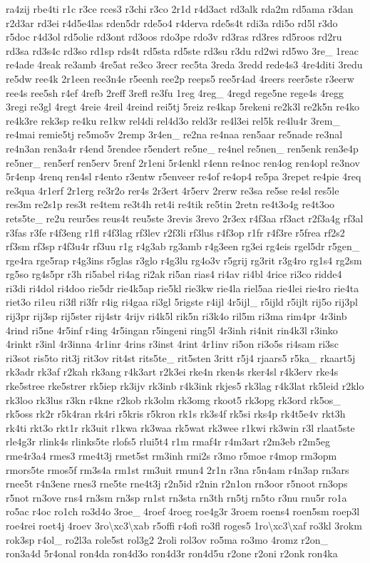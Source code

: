 \begin{DoxyCompactItemize}
ra4zij rbe4ti r1c r3ce rces3 r3chi r3co 2r1d r4d3act rd3alk rda2m rd5ama r3dan r2d3ar rd3ei r4d5e4las rden5dr rde5o4 r4derva rde5s4t rdi3a rdi5o rd5l r3do r5doc r4d3ol rd5olie rd3ont rd3oos rdo3pe rdo3v rd3ras rd3res rd5roos rd2ru rd3sa rd3s4c rd3so rd1sp rds4t rd5sta rd5ste rd3su r3du rd2wi rd5wo 3re\-\_\- 1reac re4ade 4reak re3amb 4re5at re3co 3recr rec5ta 3reda 3redd rede4s3 4re4diti 3redu re5dw ree4k 2r1een ree3n4e r5eenh ree2p reeps5 ree5r4ad 4reers reer5ste r3eerw ree4s ree5sh r4ef 4refb 2reff 3refl re3fu 1reg 4reg\-\_\- 4regd rege5ne rege4s 4regg 3regi re3gl 4regt 4reie 4reil 4reind rei5tj 5reiz re4kap 5rekeni re2k3l re2k5n re4ko re4k3re rek3sp re4ku re1kw rel4di rel4d3o reld3r re4l3ei rel5k re4lu4r 3rem\-\_\- re4mai remie5tj re5mo5v 2remp 3r4en\-\_\- re2na re4naa ren5aar re5nade re3nal re4n3an ren3a4r r4end 5rendee r5endert re5ne\-\_\- re4nel re5nen\-\_\- ren5enk ren3e4p re5ner\-\_\- ren5erf ren5erv 5renf 2r1eni 5r4enkl r4enn re4noc ren4og ren4opl re3nov 5r4enp 4renq ren4sl r4ento r3entw r5enveer re4of re4op4 re5pa 3repet re4pie 4req re3qua 4r1erf 2r1erg re3r2o rer4s 2r3ert 4r5erv 2rerw re3sa re5se re4sl res5le res3m re2s1p res3t re4tem re3t4h ret4i re4tik re5tin 2retn re4t3o4g re4t3oo rets5te\-\_\- re2u reur5es reus4t reu5ste 3revis 3revo 2r3ex r4f3aa rf3act r2f3a4g rf3al r3fas r3fe r4f3eng r1fl r4f3lag rf3lev r2f3li rf3lus r4f3op r1fr r4f3re r5frea rf2s2 rf3sm rf3sp r4f3u4r rf3uu r1g r4g3ab rg3amb r4g3een rg3ei rg4eis rgel5dr r5gen\-\_\- rge4ra rge5rap r4g3ins r5glas r3glo r4g3lu rg4o3v r5grij rg3rit r3g4ro rg1s4 rg2sm rg5so rg4s5pr r3h ri5abel ri4ag ri2ak ri5an rias4 ri4av ri4bl 4rice ri3co ridde4 ri3di ri4dol ri4doo rie5dr rie4k5ap rie5kl rie3kw rie4la riel5aa rie4lei rie4ro rie4ta riet3o ri1eu ri3fl ri3fr r4ig ri4gaa ri3gl 5rigste r4ijl 4r5ijl\-\_\- r5ijld r5ijlt rij5o rij3pl rij3pr rij3sp rij5ster rij4str 4rijv ri4k5l rik5n ri3k4o ril5m ri3ma rim4pr 4r3inb 4rind ri5ne 4r5inf r4ing 4r5ingan r5ingeni ring5l 4r3inh ri4nit rin4k3l r3inko 4rinkt r3inl 4r3inna 4r1inr 4rins r3inst 4rint 4r1inv ri5on ri3o5s ri4sam ri3sc ri3sot ris5to rit3j rit3ov rit4st rits5te\-\_\- rit5sten 3ritt r5j4 rjaars5 r5ka\-\_\- rkaart5j rk3adr rk3af r2kah rk3ang r4k3art r2k3ei rke4n rken4s rker4sl r4k3erv rke4s rke5stree rke5strer rk5iep rk3ijv rk3inb r4k3ink rkjes5 rk3lag r4k3lat rk5leid r2klo rk3loo rk3lus r3kn r4kne r2kob rk3olm rk3omg rkoot5 rk3opg rk3ord rk5os\-\_\- rk5oss rk2r r5k4ran rk4ri r5kris r5kron rk1s rk3s4f rk5si rks4p rk4t5e4v rkt3h rk4ti rkt3o rkt1r rk3uit r1kwa rk3waa rk5wat rk3wee r1kwi rk3win r3l rlaat5ste rle4g3r rlink4s rlinks5te rlofs5 rlui5t4 r1m rmaf4r r4m3art r2m3eb r2m5eg rme4r3a4 rmes3 rme4t3j rmet5st rm3inh rmi2s r3mo r5moe r4mop rm3opm rmors5te rmos5f rm3s4a rm1st rm3uit rmun4 2r1n r3na r5n4am r4n3ap rn3ars rnee5t r4n3ene rnes3 rne5te rne4t3j r2n5id r2nin r2n1on rn3oor r5noot rn3ops r5not rn3ove rns4 rn3sm rn3sp rn1st rn3sta rn3th rn5tj rn5to r3nu rnu5r ro1a ro5ac r4oc ro1ch ro3d4o 3roe\-\_\- 4roef 4roeg roe4g3r 3roem roens4 roen5sm roep3l roe4rei roet4j 4roev 3ro\textbackslash{}xc3\textbackslash{}xab r5offi r4ofi ro3fl roges5 1ro\textbackslash{}xc3\textbackslash{}xaf ro3kl 3rokm rok3sp r4ol\-\_\- ro2l3a role5st rol3g2 2roli rol3ov ro5ma ro3mo 4romz r2on\-\_\- ron3a4d 5r4onal ron4da ron4d3o ron4d3r ron4d5u r2one r2oni r2onk ron4ka 
\end{DoxyCompactItemize}
